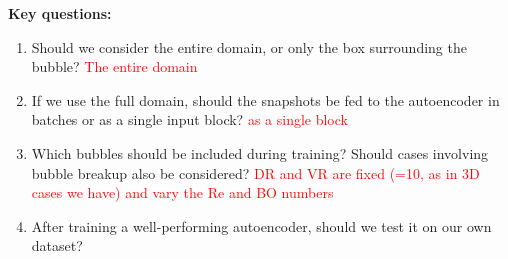 \documentclass[17pt]{extreport}
\begin{document}
\noindent\textbf{Key questions:}
\begin{enumerate}
    \item Should we consider the entire domain, or only the box surrounding the bubble? \textcolor{red}{The entire domain}
    \item If we use the full domain, should the snapshots be fed to the autoencoder in batches or as a single input block? \textcolor{red}{as a single block}
    \item Which bubbles should be included during training? Should cases involving bubble breakup also be considered? \textcolor{red}{DR and VR are fixed (=10, as in 3D cases we have) and vary the Re and BO numbers}
    \item After training a well-performing autoencoder, should we test it on our own dataset?
\end{enumerate}
\end{document}
